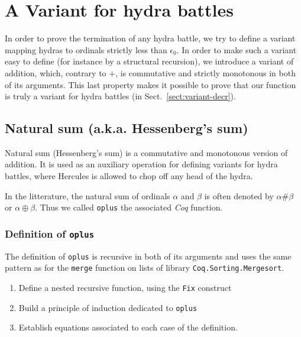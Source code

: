 \section{A Variant for hydra battles}

In order to prove the termination of any hydra battle, we try to define a variant mapping hydras to ordinals strictly less than $\epsilon_0$.
In order to make such a variant easy to define (for instance by a structural recursion), we introduce a variant of addition, which, contrary to
$+$, is commutative and strictly monotonous in both of its arguments. This last property makes it possible to prove that our function is 
truly a variant for hydra battles (in Sect.~\vref{sect:variant-decr}).

\subsection{Natural sum (a.k.a. Hessenberg's  sum)}
\label{sec:orgheadline87}
\label{hydra-variant}

Natural sum (Hessenberg's  sum) is a commutative and monotonous version of
addition. It is used as an auxiliary operation  for defining variants
for hydra battles, where Hercules is allowed to chop off any  head of the hydra.

In the litterature, the natural sum of ordinals \(\alpha\) and \(\beta\) 
is often denoted by \(\alpha \# \beta\)  or  \(\alpha \oplus  \beta\).
Thus we called \texttt{oplus} the associated \emph{Coq} function.

\subsubsection{Definition of \texttt{oplus}}
\label{sec:orgheadline84}

The definition of \texttt{oplus} is recursive in both of its 
arguments and uses  the same pattern as for the \texttt{merge} function on lists of library
\texttt{Coq.Sorting.Mergesort}.

\begin{enumerate}
\item Define a nested recursive function, using the \texttt{Fix} 
    construct

\item Build a principle of induction dedicated to \texttt{oplus}

\item Establish equations associated to each case of the definition.
\end{enumerate}


